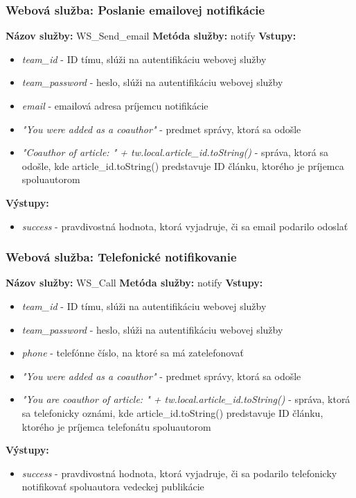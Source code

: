 \documentclass[10pt,oneside,slovak,a4paper]{article}
\begin{document}
\subsubsection{Webová služba: Poslanie emailovej notifikácie}
\textbf{Názov služby:} WS\_Send\_email
\textbf{Metóda služby:} notify
\textbf{Vstupy:}
	\begin{itemize}
		\item \textit{team\_id} - ID tímu, slúži na autentifikáciu webovej služby
		\item \textit{team\_password} - heslo, slúži na autentifikáciu webovej služby
		\item \textit{email} - emailová adresa príjemcu notifikácie
		\item \textit{"You were added as a coauthor"} - predmet správy, ktorá sa odošle
		\item \textit{"Coauthor of article: " + tw.local.article\_id.toString()} - správa, ktorá sa odošle, kde article\_id.toString() predstavuje ID článku, ktorého je príjemca spoluautorom
	\end{itemize}
\textbf{Výstupy:}
	\begin{itemize}
		\item \textit{success} - pravdivostná hodnota, ktorá vyjadruje, či sa email podarilo odoslať
	\end{itemize}

\subsubsection{Webová služba: Telefonické notifikovanie}
\textbf{Názov služby:} WS\_Call
\textbf{Metóda služby:} notify
\textbf{Vstupy:}
	\begin{itemize}
		\item \textit{team\_id} - ID tímu, slúži na autentifikáciu webovej služby
		\item \textit{team\_password} - heslo, slúži na autentifikáciu webovej služby
		\item \textit{phone} - telefónne číslo, na ktoré sa má zatelefonovať
		\item \textit{"You were added as a coauthor"} - predmet správy, ktorá sa odošle
		\item \textit{"You are coauthor of article: " + tw.local.article\_id.toString()} - správa, ktorá sa telefonicky oznámi, kde article\_id.toString() predstavuje ID článku, ktorého je príjemca telefonátu spoluautorom
	\end{itemize}
\textbf{Výstupy:}
	\begin{itemize}
		\item \textit{success} - pravdivostná hodnota, ktorá vyjadruje, či sa podarilo telefonicky notifikovať spoluautora vedeckej publikácie
	\end{itemize}
\end{document}
